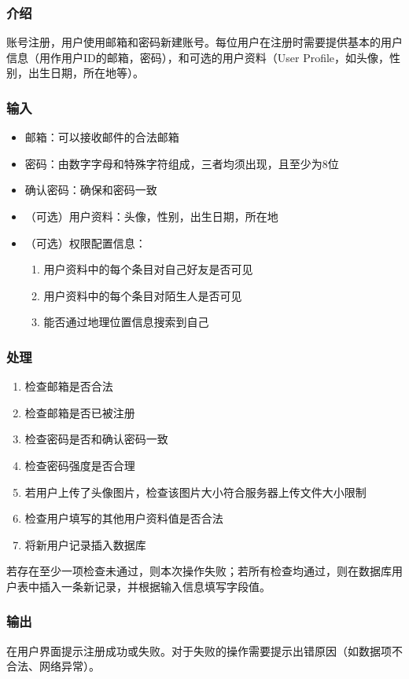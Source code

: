 \subsubsection{介绍}

账号注册，用户使用邮箱和密码新建账号。每位用户在注册时需要提供基本的用户信息（用作用户ID的邮箱，密码），和可选的用户资料（User Profile，如头像，性别，出生日期，所在地等）。

\subsubsection{输入}
\begin{itemize}
	\item 邮箱：可以接收邮件的合法邮箱
	\item 密码：由数字字母和特殊字符组成，三者均须出现，且至少为8位
	\item 确认密码：确保和密码一致
	\item （可选）用户资料：头像，性别，出生日期，所在地
	\item （可选）权限配置信息：
		\begin{enumerate}	
		\item 用户资料中的每个条目对自己好友是否可见
		\item 用户资料中的每个条目对陌生人是否可见
		\item 能否通过地理位置信息搜索到自己
		\end{enumerate}
	\end{itemize}

\subsubsection{处理}
\begin{enumerate}
	\item 检查邮箱是否合法
	\item 检查邮箱是否已被注册
	\item 检查密码是否和确认密码一致
	\item 检查密码强度是否合理
	\item 若用户上传了头像图片，检查该图片大小符合服务器上传文件大小限制
	\item 检查用户填写的其他用户资料值是否合法
	\item 将新用户记录插入数据库
	\end{enumerate}
若存在至少一项检查未通过，则本次操作失败；若所有检查均通过，则在数据库用户表中插入一条新记录，并根据输入信息填写字段值。

\subsubsection{输出}
在用户界面提示注册成功或失败。对于失败的操作需要提示出错原因（如数据项不合法、网络异常）。


